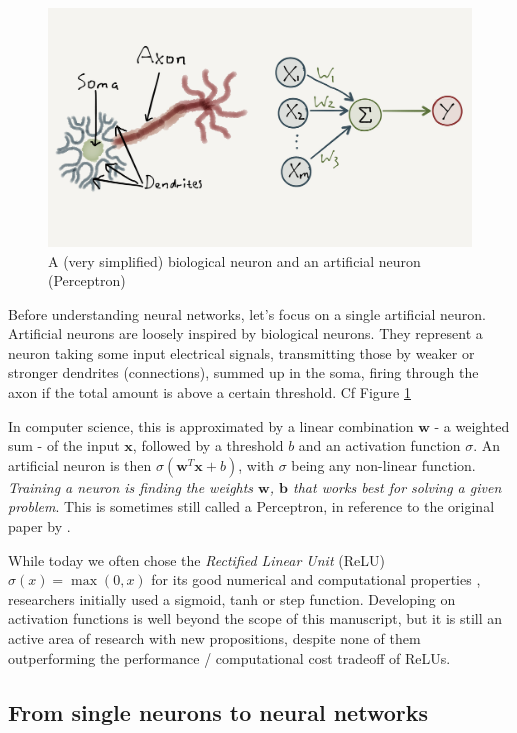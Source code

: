 \begin{figure}[h]
    \centering
    \includegraphics[scale=0.1]{30-activity/neuron.png}
    \caption{A (very simplified) biological neuron and an artificial neuron (Perceptron)}
    \label{fig:neuron}
\end{figure}

Before understanding neural networks, let's focus on a single artificial neuron. Artificial neurons are loosely inspired by biological neurons. They represent a neuron taking some input electrical signals, transmitting those by weaker or stronger dendrites (connections), summed up in the soma, firing through the axon if the total amount is above a certain threshold. Cf Figure \ref{fig:neuron}

In computer science, this is approximated by a linear combination $\textbf{w}$ - a weighted sum - of the input $\textbf{x}$, followed by a threshold $b$ and an activation function $\sigma$. An artificial neuron is then $\sigma(\textbf{w}^T\textbf{x}+b)$, with $\sigma$ being any non-linear function. \emph{Training a neuron is finding the weights $\textbf{w}$, $\textbf{b}$ that works best for solving a given problem}. This is sometimes still called a Perceptron, in reference to the original paper by \citet{perceptron}.

While today we often chose the \emph{Rectified Linear Unit} (ReLU) $\sigma(x)=\max(0, x)$ for its good numerical and computational properties \citep{relu}, researchers initially used a sigmoid, tanh or step function. Developing on activation functions is well beyond the scope of this manuscript, but it is still an active area of research with new propositions, despite none of them outperforming the performance / computational cost tradeoff of ReLUs.

\subsection{From single neurons to neural networks}

